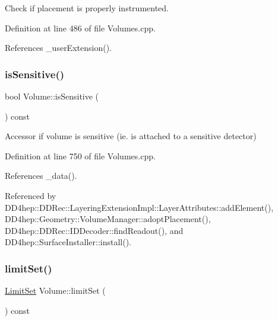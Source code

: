 Check if placement is properly instrumented. 



Definition at line 486 of file Volumes.\+cpp.



References \+\_\+user\+Extension().

\hypertarget{class_d_d4hep_1_1_geometry_1_1_volume_aa324bff4bb7c4e5a4575f81819d78d48}{}\label{class_d_d4hep_1_1_geometry_1_1_volume_aa324bff4bb7c4e5a4575f81819d78d48} 
\subsubsection{\texorpdfstring{is\+Sensitive()}{isSensitive()}}
{\footnotesize\ttfamily bool Volume\+::is\+Sensitive (\begin{DoxyParamCaption}{ }\end{DoxyParamCaption}) const}



Accessor if volume is sensitive (ie. is attached to a sensitive detector) 



Definition at line 750 of file Volumes.\+cpp.



References \+\_\+data().



Referenced by D\+D4hep\+::\+D\+D\+Rec\+::\+Layering\+Extension\+Impl\+::\+Layer\+Attributes\+::add\+Element(), D\+D4hep\+::\+Geometry\+::\+Volume\+Manager\+::adopt\+Placement(), D\+D4hep\+::\+D\+D\+Rec\+::\+I\+D\+Decoder\+::find\+Readout(), and D\+D4hep\+::\+Surface\+Installer\+::install().

\hypertarget{class_d_d4hep_1_1_geometry_1_1_volume_a0b564109f4f3079cade9e50198b27392}{}\label{class_d_d4hep_1_1_geometry_1_1_volume_a0b564109f4f3079cade9e50198b27392} 
\subsubsection{\texorpdfstring{limit\+Set()}{limitSet()}}
{\footnotesize\ttfamily \hyperlink{class_d_d4hep_1_1_geometry_1_1_limit_set}{Limit\+Set} Volume\+::limit\+Set (\begin{DoxyParamCaption}{ }\end{DoxyParamCaption}) const}



